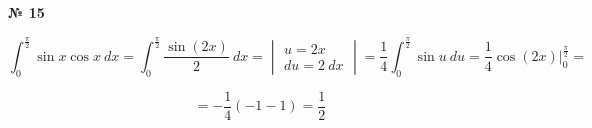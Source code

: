 \documentclass{article}
\begin{document}
\textbf{№ 15} 
\large

$$ \int_{0}^{\frac{\pi}{2}} \sin{x}\cos{x} \ dx 
= \int_{0}^{\frac{\pi}{2}} \frac{\sin{(2x)}}{2} \ dx 
= \begin{vmatrix} u = 2x \\
                 du = 2 \ dx \end{vmatrix}
= \frac{1}{4} \int_{0}^{\frac{\pi}{2}} \sin{u} \ du
= \frac{1}{4} \cos{(2x)} \bigg\vert_{0}^{\frac{\pi}{2}} 
= $$

$$ = - \frac{1}{4} \left( -1 -1  \right)
= \frac{1}{2} $$
\end{document}
